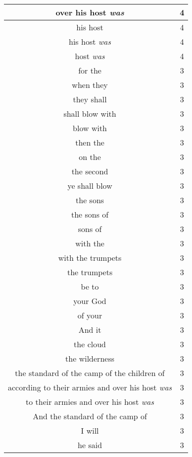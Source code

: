 \begin{center}
\begin{longtable}{|c|c|}
over his host \emph{was} & 4\\ \hline 
his host & 4\\ \hline 
his host \emph{was} & 4\\ \hline 
host \emph{was} & 4\\ \hline 
for the & 3\\ \hline 
when they & 3\\ \hline 
they shall & 3\\ \hline 
shall blow with & 3\\ \hline 
blow with & 3\\ \hline 
then the & 3\\ \hline 
on the & 3\\ \hline 
the second & 3\\ \hline 
ye shall blow & 3\\ \hline 
the sons & 3\\ \hline 
the sons of & 3\\ \hline 
sons of & 3\\ \hline 
with the & 3\\ \hline 
with the trumpets & 3\\ \hline 
the trumpets & 3\\ \hline 
be to & 3\\ \hline 
your God & 3\\ \hline 
of your & 3\\ \hline 
And it & 3\\ \hline 
the cloud & 3\\ \hline 
the wilderness & 3\\ \hline 

the standard of the camp of the children of & 3\\ \hline 


according to their armies and over his host \emph{was} & 3\\ \hline 

to their armies and over his host \emph{was} & 3\\ \hline 

And the standard of the camp of & 3\\ \hline 
I will & 3\\ \hline 
he said & 3\\ \hline 
\end{longtable}
\end{center}





